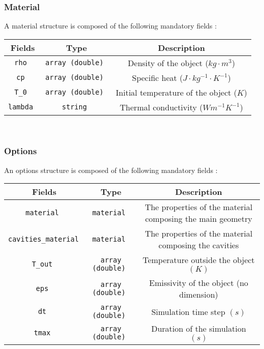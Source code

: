 \subsubsection{Material}

A material structure is composed of the following mandatory fields :

\renewcommand{\arraystretch}{1.5}
\begin{table}[h]
    \centering
    \begin{tabular}{|>{\customfont}c|>{\customfont}c|>{\customfont}c|}
        \hline 
        \rowcolor{gray!30}
        \textbf{Fields} & \textbf{Type} & \textbf{Description} \\ \hline
        \tt rho & \tt array (double) & Density of the object ($kg \cdot m^3$) \\ \hline 
        \tt cp & \tt array (double) & Specific heat ($J  \cdot kg^{-1} \cdot K^{-1}$) \\ \hline 
        \tt T\_0	& \tt array (double) & Initial temperature of the object ($K$) \\ \hline 
        \tt lambda & \tt string & Thermal conductivity ($W m^{-1} K^{-1}$) \\ \hline
    \end{tabular}
\end{table}
\ 


\subsubsection{Options}

An options structure is composed of the following mandatory fields :

\renewcommand{\arraystretch}{1.5}
\begin{table}[h]
    \centering
    \begin{tabular}{|>{\customfont}c|>{\customfont}c|>{\customfont}c|}
        \hline 
        \rowcolor{gray!30}
        \textbf{Fields} & \textbf{Type} & \textbf{Description} \\ \hline
        \tt material & \tt material & The properties of the material composing the main geometry\\ \hline 
        \tt cavities\_material & \tt material & The properties of the material composing the cavities \\ \hline 
        \tt T\_out	& \tt array (double) & Temperature outside the object $(K)$ \\ \hline 
        \tt eps & \tt array (double) & Emissivity of the object (no dimension) \\ \hline 
        \tt dt & \tt array (double) & Simulation time step $(s)$ \\ \hline 
        \tt tmax & \tt array (double) & Duration of the simulation $(s)$ \\ \hline
    \end{tabular}
\end{table}
\ 


